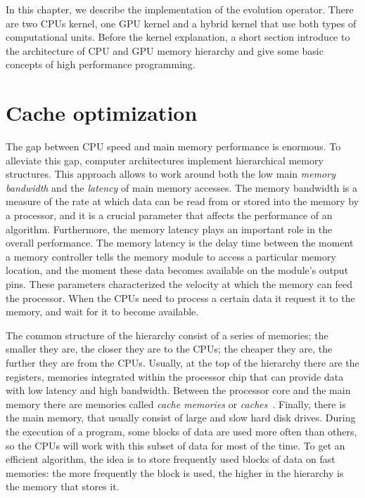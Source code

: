 In this chapter, we describe the implementation of the evolution operator. There are two CPUs kernel, one GPU kernel and a hybrid kernel that use both types of computational units. Before the kernel explanation, a short section introduce to the architecture of CPU and GPU memory hierarchy and give some basic concepts of high performance programming.

\section{Cache optimization}
The gap between CPU speed and main memory performance is enormous. To alleviate this gap, computer architectures implement hierarchical memory structures. This approach allows to work around both the low main \textit{memory bandwidth} and the \textit{latency} of main memory accesses.
The memory bandwidth is a measure of the rate at which data can be read from or stored into the memory by a processor, and it is a crucial parameter that affects the performance of an algorithm. Furthermore, the memory latency plays an important role in the overall performance. The memory latency is the delay time between the moment a memory controller tells the memory module to access a particular memory location, and the moment these data becomes available on the module's output pins. These parameters characterized the velocity at which the memory can feed the processor. When the CPUs need to process a certain data it request it to the memory, and wait for it to become available.
 
  The common structure of the hierarchy consist of a series of memories; the smaller they are, the closer they are to the CPUs; the cheaper they are, the further they are from the CPUs. Usually, at the top of the hierarchy there are the registers, memories integrated within the processor chip that can provide data with low latency and high bandwidth. Between the processor core and the main memory there are memories called \emph{cache memories} or \emph{caches}~\citep{Handy}. Finally, there is the main memory, that usually consist of large and slow hard disk drives. During the execution of a program, some blocks of data are used more often than others, so the CPUs will work with this subset of data for most of the time. To get an efficient algorithm, the idea is to store frequently used blocks of data on fast memories: the more frequently the block is used, the higher in the hierarchy is the memory that stores it. 

